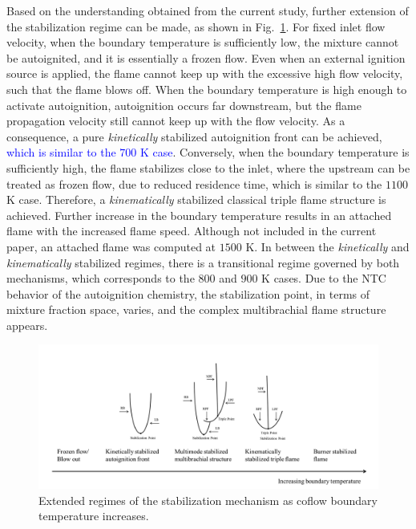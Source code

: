 \documentclass[review,3p,times]{elsarticle}
\begin{document}
Based on the understanding obtained from the current study, further extension of the stabilization regime can be made, as shown in Fig.~\ref{fig:regime}.  For fixed inlet flow velocity, when the boundary temperature is sufficiently low, the mixture cannot be autoignited, and it is essentially a frozen flow.  Even when an external ignition source is applied, the flame cannot keep up with the excessive high flow velocity, such that the flame blows off.  When the boundary temperature is high enough to activate autoignition, autoignition occurs far downstream, but the flame propagation velocity still cannot keep up with the flow velocity.  As a consequence, a pure \emph {kinetically} stabilized autoignition front can be achieved, \textcolor{blue}{which is similar to the $700$ K case}.  Conversely, when the boundary temperature is sufficiently high, the flame stabilizes close to the inlet, where the upstream can be treated as frozen flow, due to reduced residence time, which is similar to the $1100$ K case.  Therefore, a \emph {kinematically} stabilized classical triple flame structure is achieved.  Further increase in the boundary temperature results in an attached flame with the increased flame speed.  Although not included in the current paper, an attached flame was computed at $1500$ K.  In between the \emph {kinetically} and \emph {kinematically} stabilized regimes, there is a transitional regime governed by both mechanisms, which corresponds to the $800$ and $900$ K cases.  Due to the NTC behavior of the autoignition chemistry, the stabilization point, in terms of mixture fraction space, varies, and the complex multibrachial flame structure appears.  

\begin{figure}[t]
  \centering
  \scriptsize
  \includegraphics[width=1.0\textwidth]{regime.png}
  \normalsize
  \caption{Extended regimes of the stabilization mechanism as coflow boundary temperature increases.}
  \label{fig:regime}
\end{figure}
\end{document}
